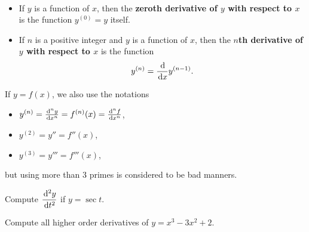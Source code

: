 \newpage

\begin{definition}\,
\begin{itemize}
\item If $y$ is a function of $x$, then the \textbf{zeroth derivative of $y$ with respect to $x$} is the function $y^{(0)}=y$ itself.
\item If $n$ is a positive integer and $y$ is a function of $x$, then the \textbf{$n$th derivative of $y$ with respect to $x$} is the function
\begin{equation*}
y^{(n)} = \frac{\mkern 2mu \mathrm{d}}{\mkern 2mu \mathrm{d} x}y^{(n-1)}.
\end{equation*}
\end{itemize}
\end{definition}

\begin{remark}
If $y=f(x)$, we also use the notations
\begin{itemize}
\item $y^{(n)} = \frac{\mkern 2mu \mathrm{d}^ny}{\mkern 2mu \mathrm{d} x^n} = f^{(n)}(x) = \frac{\mkern 2mu \mathrm{d}^n f}{\mkern 2mu \mathrm{d} x^n}$,
\item $y^{(2)} = y'' = f''(x)$,
\item $y^{(3)} = y''' = f'''(x)$,
\end{itemize}
but using more than 3 primes is considered to be bad manners.
\end{remark}

\begin{example}
Compute $\displaystyle\frac{\mkern 2mu \mathrm{d}^2 y}{\mkern 2mu \mathrm{d} t^2}$ if $y=\sec t$.
\end{example}
\vfill

\begin{example}
Compute all higher order derivatives of $y=x^3-3x^2+2$.
\end{example}
\vfill

